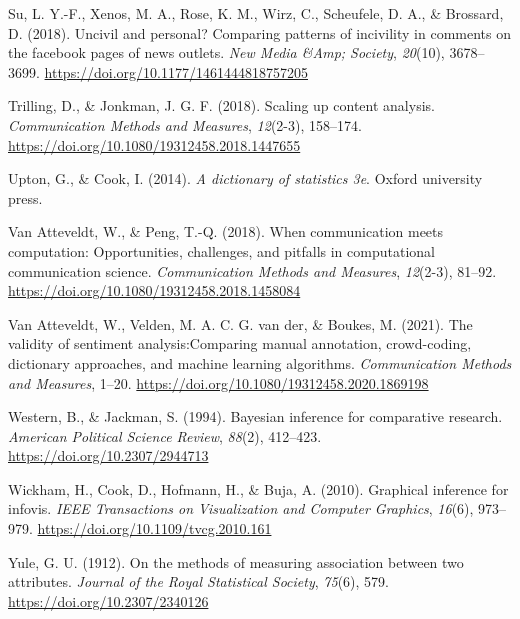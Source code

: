 \documentclass[english,man,floatsintext]{apa6}
\begin{document}
\leavevmode\hypertarget{ref-su:2018:U}{}%
Su, L. Y.-F., Xenos, M. A., Rose, K. M., Wirz, C., Scheufele, D. A., \& Brossard, D. (2018). Uncivil and personal? Comparing patterns of incivility in comments on the facebook pages of news outlets. \emph{New Media \&Amp; Society}, \emph{20}(10), 3678--3699. \url{https://doi.org/10.1177/1461444818757205}

\leavevmode\hypertarget{ref-trilling:2018:SCA}{}%
Trilling, D., \& Jonkman, J. G. F. (2018). Scaling up content analysis. \emph{Communication Methods and Measures}, \emph{12}(2-3), 158--174. \url{https://doi.org/10.1080/19312458.2018.1447655}

\leavevmode\hypertarget{ref-upton2014}{}%
Upton, G., \& Cook, I. (2014). \emph{A dictionary of statistics 3e}. Oxford university press.

\leavevmode\hypertarget{ref-atteveldt:2018:wcm}{}%
Van Atteveldt, W., \& Peng, T.-Q. (2018). When communication meets computation: Opportunities, challenges, and pitfalls in computational communication science. \emph{Communication Methods and Measures}, \emph{12}(2-3), 81--92. \url{https://doi.org/10.1080/19312458.2018.1458084}

\leavevmode\hypertarget{ref-atteveldt:2021:VSA}{}%
Van Atteveldt, W., Velden, M. A. C. G. van der, \& Boukes, M. (2021). The validity of sentiment analysis:Comparing manual annotation, crowd-coding, dictionary approaches, and machine learning algorithms. \emph{Communication Methods and Measures}, 1--20. \url{https://doi.org/10.1080/19312458.2020.1869198}

\leavevmode\hypertarget{ref-western:1994:BIC}{}%
Western, B., \& Jackman, S. (1994). Bayesian inference for comparative research. \emph{American Political Science Review}, \emph{88}(2), 412--423. \url{https://doi.org/10.2307/2944713}

\leavevmode\hypertarget{ref-wickham:2010:G}{}%
Wickham, H., Cook, D., Hofmann, H., \& Buja, A. (2010). Graphical inference for infovis. \emph{IEEE Transactions on Visualization and Computer Graphics}, \emph{16}(6), 973--979. \url{https://doi.org/10.1109/tvcg.2010.161}

\leavevmode\hypertarget{ref-yule:1912:MMA}{}%
Yule, G. U. (1912). On the methods of measuring association between two attributes. \emph{Journal of the Royal Statistical Society}, \emph{75}(6), 579. \url{https://doi.org/10.2307/2340126}

\endgroup
\end{document}
